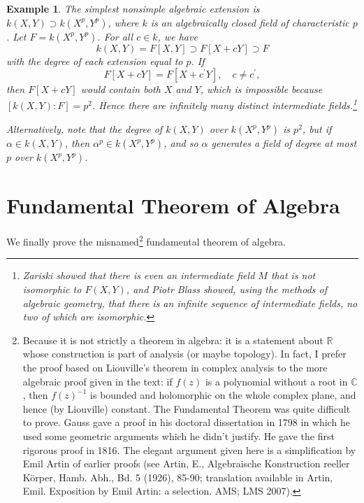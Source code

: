 \documentclass[a4paper,11pt,final,openany]{memoir}
\newtheorem{example}[X]{Example}
\theoremstyle{nonumberplain}
\begin{document}
\begin{example}
\label{ag4m}The simplest nonsimple algebraic extension is $k(X,Y)\supset
k(X^{p},Y^{p})$, where $k$ is an algebraically closed field of characteristic
$p$. Let $F=k(X^{p},Y^{p})$. For all $c\in k$, we have
\[
k(X,Y)=F[X,Y]\supset F[X+cY]\supset F
\]
with the degree of each extension equal to $p$. If
\[
F[X+cY]=F[X+c^{\prime}Y],\quad c\neq c^{\prime},
\]
then $F[X+cY]$ would contain both $X$ and $Y$, which is impossible because
$[k(X,Y)\colon F]=p^{2}$. Hence there are infinitely many distinct
intermediate fields.\footnote{Zariski showed that there is even an
intermediate field $M$ that is not isomorphic to $F(X,Y)$, and Piotr Blass
showed, using the methods of algebraic geometry, that there is an infinite
sequence of intermediate fields, no two of which are isomorphic.}

Alternatively, note that the degree of $k(X,Y)$ over $k(X^{p},Y^{p})$ is
$p^{2}$, but if $\alpha\in k(X,Y)$, then $\alpha^{p}\in k(X^{p},Y^{p})$, and
so $\alpha$ generates a field of degree at most $p$ over $k(X^{p},Y^{p})$.
\end{example}

\section{Fundamental Theorem of Algebra}%

%


We finally prove the misnamed\footnote{Because it is not strictly a theorem in
algebra: it is a statement about $\mathbb{R}$ whose construction is part of
analysis (or maybe topology). In fact, I prefer the proof based on Liouville's
theorem in complex analysis to the more algebraic proof given in the text: if
$f(z)$ is a polynomial without a root in $\mathbb{C}$, then $f(z)^{-1}$ is
bounded and holomorphic on the whole complex plane, and hence (by Liouville)
constant. The Fundamental Theorem was quite difficult to prove. Gauss gave a
proof in his doctoral dissertation in 1798 in which he used some geometric
arguments which he didn't justify. He gave the first rigorous proof in 1816.
The elegant argument given here is a simplification by Emil Artin of earlier
proofs (see Artin, E., Algebraische Konstruction reeller K\"{o}rper, Hamb.
Abh., Bd. 5 (1926), 85-90; translation available in Artin, Emil. Exposition by
Emil Artin: a selection. AMS; LMS 2007).} fundamental theorem of algebra.%
%
\end{document}

